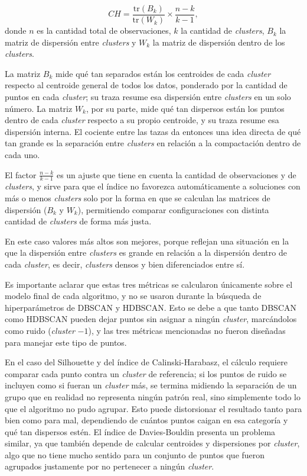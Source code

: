 \documentclass[a4paper,10pts,openany]{book}
\begin{document}
	\begin{equation}
		CH = \frac{\text{tr}(B_k)}{\text{tr}(W_k)} \times \frac{n - k}{k - 1},
	\end{equation}
	donde $n$ es la cantidad total de observaciones, $k$ la cantidad de \emph{clusters}, $B_k$ la matriz de dispersión entre \emph{clusters} y $W_k$ la matriz de dispersión dentro de los \emph{clusters}.
	
	La matriz $B_k$ mide qué tan separados están los centroides de cada \emph{cluster} respecto al centroide general de todos los datos, ponderado por la cantidad de puntos en cada \emph{cluster}; su traza  resume esa dispersión entre \emph{clusters} en un solo número. La matriz $W_k$, por su parte, mide qué tan dispersos están los puntos dentro de cada \emph{cluster} respecto a su propio centroide, y su traza resume esa dispersión interna. El cociente entre las tazas da entonces una idea directa de qué tan grande es la separación entre \emph{clusters} en relación a la compactación dentro de cada uno.
	
	El factor $\frac{n-k}{k-1}$ es un ajuste que tiene en cuenta la cantidad de observaciones y de \emph{clusters}, y sirve para que el índice no favorezca automáticamente a soluciones con más o menos \emph{clusters} solo por la forma en que se calculan las matrices de dispersión ($B_k$ y $W_k$), permitiendo comparar configuraciones con distinta cantidad de \emph{clusters} de forma más justa.
	
	En este caso valores más altos son mejores, porque reflejan una situación en la que la dispersión entre \emph{clusters} es grande en relación a la dispersión dentro de cada \emph{cluster}, es decir, \emph{clusters} densos y bien diferenciados entre sí.
	
	Es importante aclarar que estas tres métricas se calcularon únicamente sobre el modelo final de cada algoritmo, y no se usaron durante la búsqueda de hiperparámetros de DBSCAN y HDBSCAN. Esto se debe a que tanto DBSCAN como HDBSCAN pueden dejar puntos sin asignar a ningún \emph{cluster}, marcándolos como ruido (\emph{cluster} $-1$), y las tres métricas mencionadas no fueron diseñadas para manejar este tipo de puntos.
	
	En el caso del Silhouette y del índice de Calinski-Harabasz, el cálculo requiere comparar cada punto contra un \emph{cluster} de referencia; si los puntos de ruido se incluyen como si fueran un \emph{cluster} más, se termina midiendo la separación de un grupo que en realidad no representa ningún patrón real, sino simplemente todo lo que el algoritmo no pudo agrupar. Esto puede distorsionar el resultado tanto para bien como para mal, dependiendo de cuántos puntos caigan en esa categoría y qué tan dispersos estén. El índice de Davies-Bouldin presenta un problema similar, ya que también depende de calcular centroides y dispersiones por \emph{cluster}, algo que no tiene mucho sentido para un conjunto de puntos que fueron agrupados justamente por no pertenecer a ningún \emph{cluster}.
	
\end{document}
